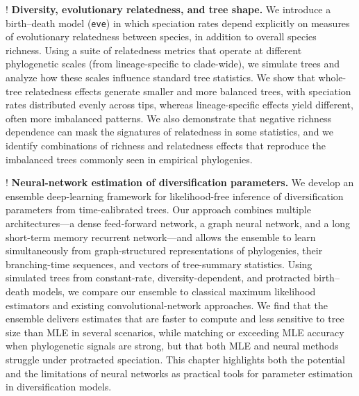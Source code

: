 \begin{fancyenumerate}
    \item! \textbf{Diversity, evolutionary relatedness, and tree shape.} We introduce a birth--death model (\texttt{eve}) in which speciation rates depend explicitly on measures of evolutionary relatedness between species, in addition to overall species richness. Using a suite of relatedness metrics that operate at different phylogenetic scales (from lineage-specific to clade-wide), we simulate trees and analyze how these scales influence standard tree statistics. We show that whole-tree relatedness effects generate smaller and more balanced trees, with speciation rates distributed evenly across tips, whereas lineage-specific effects yield different, often more imbalanced patterns. We also demonstrate that negative richness dependence can mask the signatures of relatedness in some statistics, and we identify combinations of richness and relatedness effects that reproduce the imbalanced trees commonly seen in empirical phylogenies.

    \item! \textbf{Neural-network estimation of diversification parameters.} We develop an ensemble deep-learning framework for likelihood-free inference of diversification parameters from time-calibrated trees. Our approach combines multiple architectures---a dense feed-forward network, a graph neural network, and a long short-term memory recurrent network---and allows the ensemble to learn simultaneously from graph-structured representations of phylogenies, their branching-time sequences, and vectors of tree-summary statistics. Using simulated trees from constant-rate, diversity-dependent, and protracted birth--death models, we compare our ensemble to classical maximum likelihood estimators and existing convolutional-network approaches. We find that the ensemble delivers estimates that are faster to compute and less sensitive to tree size than MLE in several scenarios, while matching or exceeding MLE accuracy when phylogenetic signals are strong, but that both MLE and neural methods struggle under protracted speciation. This chapter highlights both the potential and the limitations of neural networks as practical tools for parameter estimation in diversification models.


\end{fancyenumerate}
